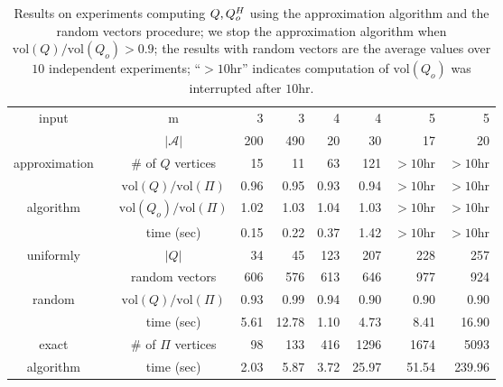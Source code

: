 \documentclass{article}
\def\A{{\mathcal A}} \def\R{{\mathcal R}}
\begin{document}
\renewcommand{\tabcolsep}{0.3cm} \begin{table*}[t]\footnotesize
\centering
\begin{tabular}{@{} c@{}c @{\hspace{0.2cm}}
|@{\hspace{0.5cm}}  c  @{\hspace{0.2cm}}  |  
@{\hspace{0.5cm}} rrrrrr  @{}}
\multirow{2}{*}{{ input}}
& & m & 3 & 3 & 4 & 4 & 5 & 5\\ 
& & $|\A|$& 200 & 490& 20 & 30& 17& 20\\\hline
\multirow{2}{*}{{ approximation}} &
& \# of $Q$ vertices&15 & 11& 63 & 121 & $>10$hr &$>10$hr\\
& & $\mbox{vol}(Q)/\mbox{vol}(\varPi)$& 0.96& 0.95& 0.93& 0.94 & $>10$hr
&$>10$hr\\
\multirow{2}{*}{{ algorithm}}
& & $\mbox{vol}(Q_{o})/\mbox{vol}(\varPi)$&1.02& 1.03 & 1.04& 1.03& $>10$hr
&$>10$hr\\
& & time (sec)& 0.15& 0.22& 0.37& 1.42& $>10$hr &$>10$hr\\\hline
\multirow{2}{*}{{ uniformly }}
&
& $|Q|$& 34& 45& 123 & 207&  228& 257\\ 
& & random vectors& 606 & 576& 613& 646& 977& 924\\
 \multirow{2}{*}{{ random}}
& & $\mbox{vol}(Q)/\mbox{vol}(\varPi)$& 0.93& 0.99& 0.94 & 0.90& 0.90& 0.90\\
& & time (sec)& 5.61& 12.78& 1.10&4.73& 8.41& 16.90\\\hline
\multirow{1}{*}{{ exact}}
&
 & \# of $\varPi$
vertices& 98 & 133& 416& 1296& 1674& 5093\\
\multirow{1}{*}{{ algorithm}}
& & time (sec)& 2.03& 5.87& 3.72& 25.97 &51.54& 239.96\\
\end{tabular}
\caption{Results on experiments computing $Q, Q_o^{H}$ using the
approximation algorithm and the random vectors procedure; we stop the
approximation algorithm when
$\mbox{vol}(Q)/\mbox{vol}(Q_{o})>0.9$; the results with random vectors
are the average
values over $10$ independent experiments; ``$>10$hr'' indicates 
computation of $\mbox{vol}(Q_{o})$ was interrupted after $10$hr. 
\label{randQ}}
\end{table*}
\end{document}
